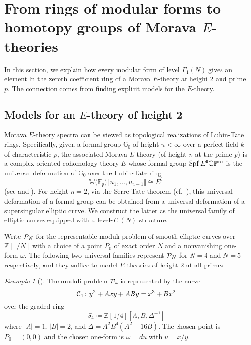 \documentclass{gtpart}
\theoremstyle{definition}
\theoremstyle{remark}
\newtheorem{ex}[thm]{Example}
\def\co{\colon\thinspace}
\newcommand{\mb}[1]{\mathbb{#1}}
\newcommand{\Spf}{{\rm Spf\thinspace}}
\newcommand{\cF}{\overline {\mb F}}
\newcommand{\CC}{{\cal C}}
\newcommand{\CP}{{\cal P}}
\newcommand{\BC}{{\mb C}}
\newcommand{\BG}{{\mb G}}
\newcommand{\BP}{{\mb P}}
\newcommand{\BW}{{\mb W}}
\newcommand{\BZ}{{\mb Z}}
\renewcommand{\D}{\Delta}
\newcommand{\G}{\Gamma}
\renewcommand{\o}{\omega}
\newcommand{\ce}{\coloneqq}
\newcommand{\lb}{\llbracket}
\newcommand{\rb}{\rrbracket}
\renewcommand{\=}{\approx}
\renewcommand{\-}{\sim}
\numberwithin{equation}{section}
\numberwithin{thm}{section}
\begin{document}
\section{From rings of modular forms to homotopy groups of Morava $E$-theories}
\label{sec:mf2E}

In this section, we explain how every modular form of level $\G_1(N)$ gives an 
element in the zeroth coefficient ring of a Morava $E$-theory at height 2 and 
prime $p$.  The connection comes from finding explicit models for the 
$E$-theory.  



\subsection{Models for an $E$-theory of height 2}
\label{subsec:model}

Morava $E$-theory spectra can be viewed as topological realizations of 
Lubin-Tate rings.  Specifically, given a formal group $\BG_0$ of height 
$n < \infty$ over a perfect field $k$ of characteristic $p$, the associated 
Morava $E$-theory (of height $n$ at the prime $p$) is a complex-oriented 
cohomology theory $E$ whose formal group $\Spf E^0 \BC\BP^\infty$ is the 
universal deformation of $\BG_0$ over the Lubin-Tate ring 
\[
 \BW \big( \cF_p \big) \lb u_1, \ldots, u_{n - 1} \rb \cong E^0 
\]
(see \cite[Section 3]{LT} and \cite[Section 7]{GH}).  For height $n = 2$, via 
the Serre-Tate theorem \cite{LST} (cf.~\cite[Theorem 2.9.1]{KM}), this universal 
deformation of a formal group can be obtained from a universal deformation of a 
supersingular elliptic curve.  We construct the latter as the universal family 
of elliptic curves equipped with a level-$\G_1(N)$ structure.  

Write $\CP_N$ for the representable moduli problem of smooth elliptic curves 
over $\BZ[1/N]$ with a choice of a point $P_0$ of exact order $N$ and a 
nonvanishing one-form $\o$.  The following two universal families represent 
$\CP_N$ for $N = 4$ and $N = 5$ respectively, and they suffice to model 
$E$-theories of height 2 at all primes.  

\begin{ex}[{\cite[Proposition 2.1]{p3}}]
 \label{ex:4}
 The moduli problem $\CP_4$ is represented by the curve 
 \[
  \CC_4 \co y^2 + A x y + A B y = x^3 + B x^2 
 \]
 over the graded ring 
 \[
  S_4 \ce \BZ[1/4][A, B, \D^{-1}] 
 \]
 where $|A| = 1$, $|B| = 2$, and $\D = A^2 B^4 (A^2 - 16 B)$.  The chosen point 
 is $P_0 = (0,0)$ and the chosen one-form is $\o = du$ with $u = x / y$.  
\end{ex}
\end{document}
